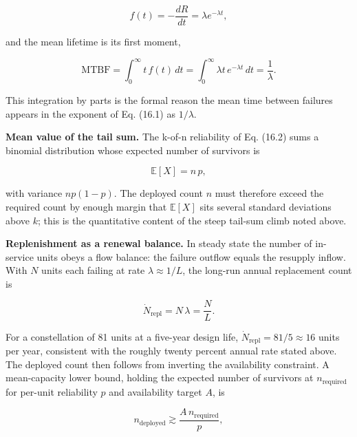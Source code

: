 \documentclass[
  11pt,
  openany,
  oneside]{book}
\begin{document}
\begin{equation}
f(t) = -\frac{dR}{dt} = \lambda e^{-\lambda t}, \tag{16.3}
\end{equation}

and the mean lifetime is its first moment,

\begin{equation}
\mathrm{MTBF} = \int_0^\infty t\,f(t)\,dt = \int_0^\infty \lambda t\, e^{-\lambda t}\,dt = \frac{1}{\lambda}. \tag{16.4}
\end{equation}

This integration by parts is the formal reason the mean time between
failures appears in the exponent of Eq. (16.1) as \(1/\lambda\).

\textbf{Mean value of the tail sum.} The k-of-n reliability of Eq.
(16.2) sums a binomial distribution whose expected number of survivors
is

\begin{equation}
\mathbb{E}[X] = n\,p, \tag{16.5}
\end{equation}

with variance \(np(1-p)\). The deployed count \(n\) must therefore
exceed the required count by enough margin that \(\mathbb{E}[X]\) sits
several standard deviations above \(k\); this is the quantitative
content of the steep tail-sum climb noted above.

\textbf{Replenishment as a renewal balance.} In steady state the number
of in-service units obeys a flow balance: the failure outflow equals the
resupply inflow. With \(N\) units each failing at rate
\(\lambda \approx 1/L\), the long-run annual replacement count is

\begin{equation}
\dot{N}_{\mathrm{repl}} = N\,\lambda = \frac{N}{L}. \tag{16.6}
\end{equation}

For a constellation of 81 units at a five-year design life,
\(\dot{N}_{\mathrm{repl}} = 81/5 \approx 16\) units per year, consistent
with the roughly twenty percent annual rate stated above. The deployed
count then follows from inverting the availability constraint. A
mean-capacity lower bound, holding the expected number of survivors at
\(n_{\mathrm{required}}\) for per-unit reliability \(p\) and
availability target \(A\), is

\begin{equation}
n_{\mathrm{deployed}} \gtrsim \frac{A\,n_{\mathrm{required}}}{p}, \tag{16.7}
\end{equation}
\end{document}
